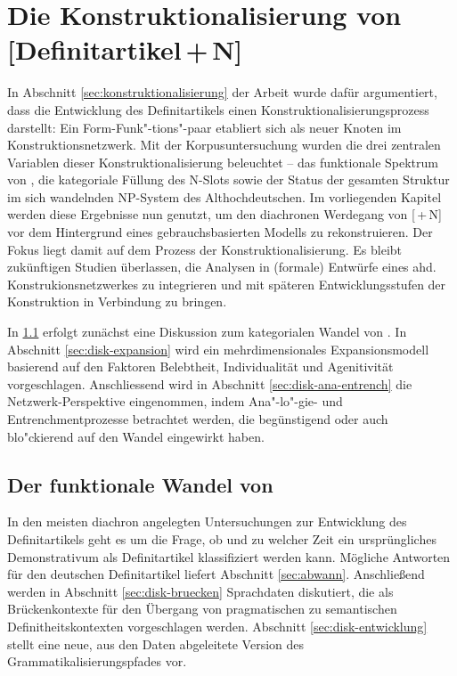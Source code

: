 \chapter{Die Konstruktionalisierung von [Definitartikel\,+\,N]} \label{bicpic}

In Abschnitt \ref{sec:konstruktionalisierung} der Arbeit wurde dafür argumentiert, dass die Entwicklung des Definitartikels einen Konstruktionalisierungsprozess darstellt: Ein Form-Funk"-tions"-paar etabliert sich als neuer Knoten im Konstruktionsnetzwerk. Mit der Korpusuntersuchung wurden die drei zentralen Variablen dieser Konstruktionalisierung beleuchtet -- das funktionale Spektrum von , die kategoriale Füllung des N-Slots sowie der Status der gesamten Struktur im sich wandelnden NP-System des Althochdeutschen. Im vorliegenden Kapitel werden diese Ergebnisse nun genutzt, um den diachronen Werdegang von [\,+\,N] vor dem Hintergrund eines gebrauchsbasierten Modells zu rekonstruieren. 
Der Fokus liegt damit auf dem Prozess der Konstruktionalisierung. Es bleibt zukünftigen Studien überlassen, die Analysen in (formale) Entwürfe eines ahd. Konstrukionsnetzwerkes zu integrieren und  mit späteren Entwicklungsstufen der Konstruktion in Verbindung zu bringen. 

In \ref{diskussion:der} erfolgt zunächst eine Diskussion zum kategorialen Wandel von .  In Abschnitt \ref{sec:disk-expansion} wird ein mehrdimensionales Expansionsmodell basierend auf den Faktoren Belebtheit,  Individualität und Agenitivität vorgeschlagen. Anschlies\-send wird in Abschnitt \ref{sec:disk-ana-entrench} die Netzwerk-Perspektive eingenommen, indem Ana"-lo"-gie- und Entrenchmentprozesse betrachtet werden, die begünstigend oder auch blo"ckierend auf den Wandel eingewirkt haben. 

\section{Der funktionale Wandel von } \label{diskussion:der}

In den meisten diachron angelegten Untersuchungen zur Entwicklung des Definitartikels geht es um die Frage, ob und zu welcher Zeit ein ursprüngliches Demonstrativum als Definitartikel klassifiziert werden kann. Mögliche Antworten für den deutschen Definitartikel liefert Abschnitt \ref{sec:abwann}. Anschließend werden in Abschnitt \ref{sec:disk-bruecken} Sprachdaten diskutiert, die  als Brückenkontexte für den Übergang von pragmatischen zu semantischen Definitheitskontexten vorgeschlagen werden. Abschnitt \ref{sec:disk-entwicklung} stellt eine neue, aus den Daten abgeleitete Version des Grammatikalisierungspfades vor. 


